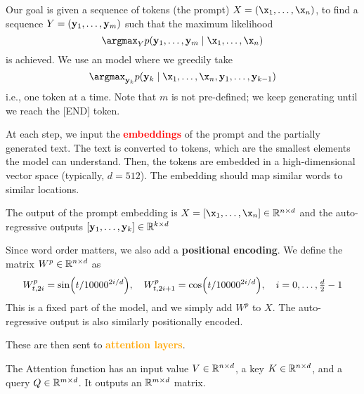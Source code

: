 \documentclass[class=cs480,notes,tikz]{agony}
\begin{document}
Our goal is given a sequence of tokens (the prompt) $X = (\x_1,\dotsc,\x_n)$,
to find a sequence $Y = (\vb y_1,\dotsc,\vb y_m)$ such that the maximum likelihood
\[ \argmax_{Y} p(\vb y_1,\dotsc,\vb y_m \mid \x_1,\dotsc,\x_n) \]
is achieved.
We use an  model where we greedily take
\[ \argmax_{\vb y_k} p(\vb y_k \mid \x_1,\dotsc,\x_n,\vb y_1,\dotsc,\vb y_{k-1}) \]
i.e., one token at a time.
Note that $m$ is not pre-defined; we keep generating until we reach the [END] token.

At each step, we input the \textcolor{Red}{\textbf{embeddings}} of the prompt and the partially generated text.
The text is converted to tokens, which are the smallest elements the model can understand.
Then, the tokens are embedded in a high-dimensional vector space (typically, $d=512$).
The embedding should map similar words to similar locations.

The output of the prompt embedding is $X = [\x_1,\dotsc,\x_n] \in \R^{n \times d}$
and the auto-regressive outputs $[\vb y_1,\dotsc,\vb y_k] \in \mathbb{R}^{k \times d}$

Since word order matters, we also add a \textbf{positional encoding}.
We define the matrix $W^p \in \mathbb{R}^{n \times d}$ as
\[ W^p_{t,2i} = \sin(t/10000^{2i/d})\qc W^p_{t,2i+1} = \cos(t/10000^{2i/d})\qc i = 0,\dotsc,\tfrac{d}{2}-1 \]
This is a fixed part of the model, and we simply add $W^p$ to $X$.
The auto-regressive output is also similarly positionally encoded.

These are then sent to \textcolor{Orange}{\textbf{attention layers}}.

The Attention function has an input value $V \in \mathbb{R}^{n \times d}$,
a key $K \in \mathbb{R}^{n \times d}$, and a query $Q \in \mathbb{R}^{m \times d}$.
It outputs an $\mathbb{R}^{m \times d}$ matrix.
\end{document}
